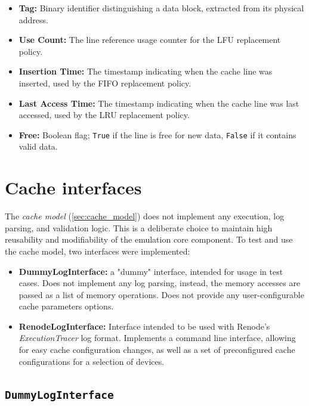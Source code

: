 \begin{itemize}
    \item \textbf{Tag:} Binary identifier distinguishing a data block, extracted from its physical address.
    \item \textbf{Use Count:} The line reference usage counter for the LFU replacement policy.
    \item \textbf{Insertion Time:} The timestamp indicating when the cache line was inserted, used by the FIFO replacement policy.
    \item \textbf{Last Access Time:} The timestamp indicating when the cache line was last accessed, used by the LRU replacement policy.
    \item \textbf{Free:} Boolean flag; \texttt{True} if the line is free for new data, \texttt{False} if it contains valid data.
\end{itemize}


\section{Cache interfaces}

The \textit{cache model} (\ref{sec:cache_model}) does not implement any execution, log parsing, and validation logic. This is a deliberate choice to maintain high reusability and modifiability
of the emulation core component. To test and use the cache model, two interfaces were implemented:

\begin{itemize}
	\item \textbf{DummyLogInterface:} a "dummy" interface, intended for usage in test cases. Does not implement any log parsing, instead, the memory accesses are passed as a list of
        memory operations. Does not provide any user-configurable cache parameters options.
    \item \textbf{RenodeLogInterface:} Interface intended to be used with Renode's \textit{ExecutionTracer} log format. Implements a command line interface, allowing for easy cache
        configuration changes, as well as a set of preconfigured cache configurations for a selection of devices.
\end{itemize}


\subsection{\texttt{DummyLogInterface}}

